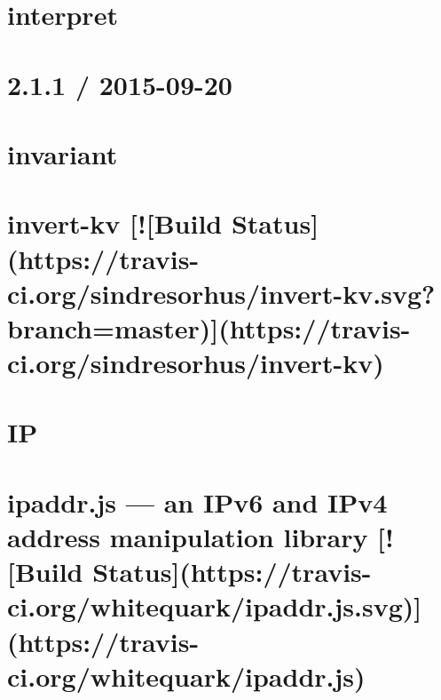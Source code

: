 \documentclass[twoside]{book}
\newcommand{\+}{\discretionary{\mbox{\scriptsize$\hookleftarrow$}}{}{}}
\begin{document}
\chapter{interpret}
\label{md__c_1_workspace_demo_src_main_script_node_modules_interpret__r_e_a_d_m_e}

\chapter{2.1.1 / 2015-\/09-\/20}
\label{md__c_1_workspace_demo_src_main_script_node_modules_invariant__c_h_a_n_g_e_l_o_g}

\chapter{invariant}
\label{md__c_1_workspace_demo_src_main_script_node_modules_invariant__r_e_a_d_m_e}

\chapter{invert-\/kv \mbox{[}!\mbox{[}Build Status\mbox{]}(https\+://travis-\/ci.org/sindresorhus/invert-\/kv.svg?branch=master)\mbox{]}(https\+://travis-\/ci.org/sindresorhus/invert-\/kv)}
\label{md__c_1_workspace_demo_src_main_script_node_modules_invert-kv_readme}

\chapter{IP}
\label{md__c_1_workspace_demo_src_main_script_node_modules_ip__r_e_a_d_m_e}

\chapter{ipaddr.\+js — an I\+Pv6 and I\+Pv4 address manipulation library \mbox{[}!\mbox{[}Build Status\mbox{]}(https\+://travis-\/ci.org/whitequark/ipaddr.js.\+svg)\mbox{]}(https\+://travis-\/ci.org/whitequark/ipaddr.js)}
\label{md__c_1_workspace_demo_src_main_script_node_modules_ipaddr_8js__r_e_a_d_m_e}

\end{document}
